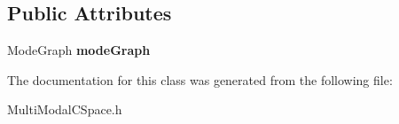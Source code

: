 \subsection*{Public Attributes}
\begin{DoxyCompactItemize}
\item 
Mode\+Graph {\bfseries mode\+Graph}\label{classExplicitMMCSpace_aa956f78edb24ebee606e88a443a205b3}

\end{DoxyCompactItemize}


The documentation for this class was generated from the following file\+:\begin{DoxyCompactItemize}
\item 
Multi\+Modal\+C\+Space.\+h\end{DoxyCompactItemize}
